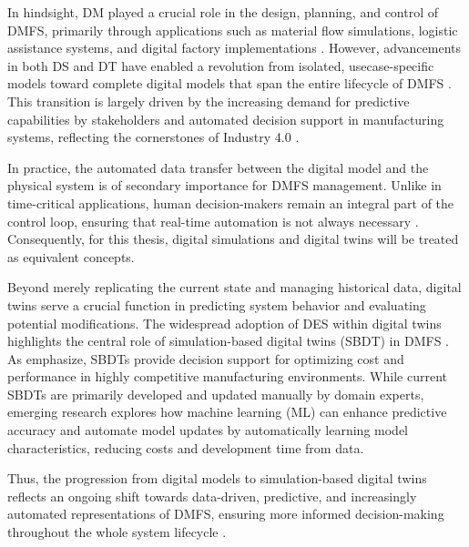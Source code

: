 In hindsight, DM played a crucial role in the design, planning, and control of DMFS, primarily through applications such as material flow simulations, logistic assistance systems, and digital factory implementations \parencite{Thiede2013}. However, advancements in both DS and DT have enabled a revolution from isolated, usecase-specific models toward complete digital models that span the entire lifecycle of DMFS \parencite{Abdoune2023}. This transition is largely driven by the increasing demand for predictive capabilities by stakeholders and automated decision support in manufacturing systems, reflecting the cornerstones of Industry 4.0 \parencite{frank2019industry}.

In practice, the automated data transfer between the digital model and the physical system is of secondary importance for DMFS management. Unlike in time-critical applications, human decision-makers remain an integral part of the control loop, ensuring that real-time automation is not always necessary \parencite{schwede2024learning}. Consequently, for this thesis, digital simulations and digital twins will be treated as equivalent concepts.

Beyond merely replicating the current state and managing historical data, digital twins serve a crucial function in predicting system behavior and evaluating potential modifications. The widespread adoption of DES within digital twins highlights the central role of simulation-based digital twins (SBDT) in DMFS \parencite{Lugaresi2021aifac}. As \citeauthor{schwede2024learning} emphasize, SBDTs provide decision support for optimizing cost and performance in highly competitive manufacturing environments. While current SBDTs are primarily developed and updated manually by domain experts, emerging research explores how machine learning (ML) can enhance predictive accuracy and automate model updates by automatically learning model characteristics, reducing costs and development time from data.

Thus, the progression from digital models to simulation-based digital twins reflects an ongoing shift towards data-driven, predictive, and increasingly automated representations of DMFS, ensuring more informed decision-making throughout the whole system lifecycle \parencite{boschert2016digital,lim2020state}.

